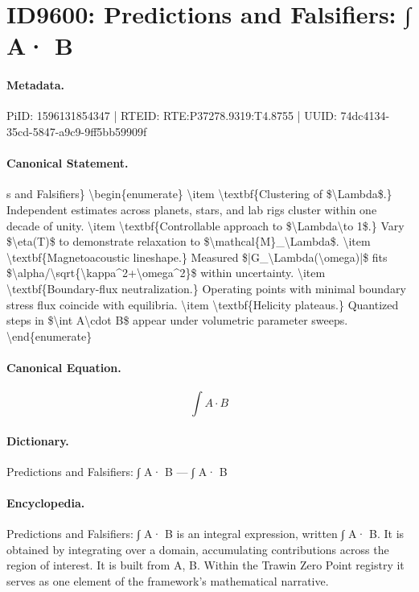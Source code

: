 \section*{ID9600: Predictions and Falsifiers: ∫ A· B}
\paragraph{Metadata.}
PiID: 1596131854347 | RTEID: RTE:P37278.9319:T4.8755 | UUID: 74dc4134-35cd-5847-a9c9-9ff5bb59909f

\paragraph{Canonical Statement.}
s and Falsifiers\} \textbackslash{}begin\{enumerate\} \textbackslash{}item \textbackslash{}textbf\{Clustering of \$\textbackslash{}Lambda\$.\} Independent estimates across planets, stars, and lab rigs cluster within one decade of unity. \textbackslash{}item \textbackslash{}textbf\{Controllable approach to \$\textbackslash{}Lambda\textbackslash{}to 1\$.\} Vary \$\textbackslash{}eta(T)\$ to demonstrate relaxation to \$\textbackslash{}mathcal\{M\}\_\textbackslash{}Lambda\$. \textbackslash{}item \textbackslash{}textbf\{Magnetoacoustic lineshape.\} Measured \$|G\_\textbackslash{}Lambda(\textbackslash{}omega)|\$ fits \$\textbackslash{}alpha/\textbackslash{}sqrt\{\textbackslash{}kappa\textasciicircum{}2+\textbackslash{}omega\textasciicircum{}2\}\$ within uncertainty. \textbackslash{}item \textbackslash{}textbf\{Boundary-flux neutralization.\} Operating points with minimal boundary stress flux coincide with equilibria. \textbackslash{}item \textbackslash{}textbf\{Helicity plateaus.\} Quantized steps in \$\textbackslash{}int A\textbackslash{}cdot B\$ appear under volumetric parameter sweeps. \textbackslash{}end\{enumerate\}

\paragraph{Canonical Equation.}
\[
\int A\cdot B
\]

\paragraph{Dictionary.}
Predictions and Falsifiers: ∫ A· B — ∫ A· B

\paragraph{Encyclopedia.}
Predictions and Falsifiers: ∫ A· B is an integral expression, written ∫ A· B. It is obtained by integrating over a domain, accumulating contributions across the region of interest. It is built from A, B. Within the Trawin Zero Point registry it serves as one element of the framework's mathematical narrative.
